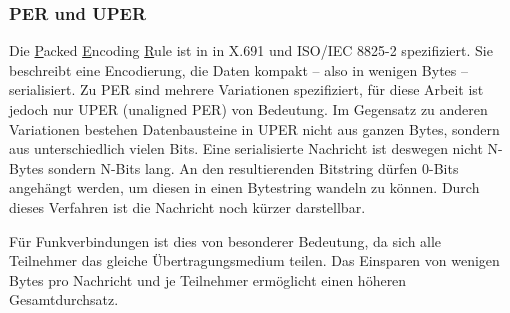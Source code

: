 \subsubsection{PER und UPER}

Die \underline{P}acked \underline{E}ncoding \underline{R}ule ist in in X.691 \cite{asn:itu:x691} und ISO/IEC 8825-2 \cite{asn:iso} spezifiziert.
Sie beschreibt eine Encodierung, die Daten kompakt -- also in wenigen Bytes -- serialisiert.
Zu PER sind mehrere Variationen spezifiziert, für diese Arbeit ist jedoch nur UPER (unaligned PER) von Bedeutung.
Im Gegensatz zu anderen Variationen bestehen Datenbausteine in UPER nicht aus ganzen Bytes, sondern aus unterschiedlich vielen Bits.
Eine serialisierte Nachricht ist deswegen nicht N-Bytes sondern N-Bits lang.
An den resultierenden Bitstring dürfen 0-Bits angehängt werden, um diesen in einen Bytestring wandeln zu können.
Durch dieses Verfahren ist die Nachricht noch kürzer darstellbar.

Für Funkverbindungen ist dies von besonderer Bedeutung, da sich alle Teilnehmer das gleiche Übertragungsmedium teilen.
Das Einsparen von wenigen Bytes pro Nachricht und je Teilnehmer ermöglicht einen höheren Gesamtdurchsatz.
